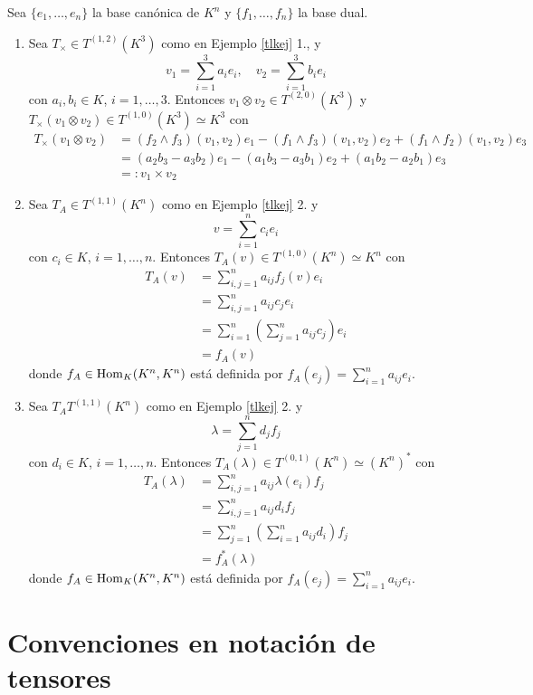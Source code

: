 \begin{ejem}
Sea $\{e_1,\ldots,e_n\}$ la base can\'onica de $K^n$ y $\{f_1,\ldots,f_n\}$ la base dual.
\begin{enumerate}
\item Sea $T_\times\in T^{(1,2)}(K^3)$ como en Ejemplo \ref{tlkej} 1., y
$$v_1=\sum_{i=1}^3a_ie_i,\quad v_2=\sum_{i=1}^3 b_ie_i$$
con $a_i,b_i\in K$, $i=1,\ldots,3$. Entonces $v_1\otimes v_2\in T^{(2,0)}(K^3)$ y $T_\times(v_1\otimes v_2)\in T^{(1,0)}(K^3)\simeq K^3$ con
\begin{align*}
T_\times(v_1\otimes v_2)&= (f_2\wedge f_3)(v_1,v_2)e_1-(f_1\wedge f_3)(v_1,v_2)e_2+(f_1\wedge f_2)(v_1,v_2)e_3\\
&=(a_2b_3-a_3b_2)e_1-(a_1b_3-a_3b_1)e_2+(a_1b_2-a_2b_1)e_3\\
&=: v_1\times v_2
\end{align*}
\item Sea $T_A\in T^{(1,1)}(K^n)$ como en Ejemplo \ref{tlkej} 2. y
$$v=\sum_{i=1}^n c_ie_i$$
con $c_i\in K$, $i=1,\ldots,n$. Entonces $T_A(v)\in T^{(1,0)}(K^n)\simeq K^n$ con
\begin{align*}
T_A(v) &=\sum_{i,j=1}^n a_{ij}f_j(v)e_i\\
 &=\sum_{i,j=1}^n a_{ij}c_je_i\\
 &=\sum_{i=1}^n\left(\sum_{j=1}^n a_{ij}c_j\right)e_i\\
 &=f_A(v)
\end{align*}
donde $f_A\in\operatorname{Hom}_K(K^n,K^n)$ est\'a definida por $f_A(e_j)=\sum_{i=1}^na_{ij}e_i$.
\item Sea $T_AT^{(1,1)}(K^n)$ como en Ejemplo \ref{tlkej} 2. y
$$\lambda=\sum_{j=1}^n d_jf_j$$
con $d_i\in K$, $i=1,\ldots,n$. Entonces $T_A(\lambda)\in T^{(0,1)}(K^n)\simeq (K^n)^*$ con
\begin{align*}
T_A(\lambda) &=\sum_{i,j=1}^n a_{ij}\lambda(e_i)f_j\\
 &=\sum_{i,j=1}^n a_{ij}d_if_j\\
 &=\sum_{j=1}^n\left(\sum_{i=1}^n a_{ij}d_i\right)f_j\\
 &=f^*_A(\lambda)
\end{align*}
donde $f_A\in\operatorname{Hom}_K(K^n,K^n)$ est\'a definida por $f_A(e_j)=\sum_{i=1}^na_{ij}e_i$.
\end{enumerate}
\end{ejem}

\section{Convenciones en notaci\'on de tensores}

